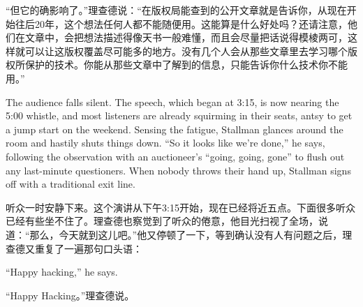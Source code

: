 \ifdefined\chs
``但它的确影响了。''理查德说：``在版权局能查到的公开文章就是告诉你，从现在开始往后20年，这个想法任何人都不能随便用。这能算是什么好处吗？还请注意，他们在文章中，会把想法描述得像天书一般难懂，而且会尽量把话说得模棱两可，这样就可以让这版权覆盖尽可能多的地方。没有几个人会从那些文章里去学习哪个版权所保护的技术。你能从那些文章中了解到的信息，只能告诉你什么技术你不能用。''
\fi

\ifdefined\eng
The audience falls silent. The speech, which began at 3:15, is now nearing the 5:00 whistle, and most listeners are already squirming in their seats, antsy to get a jump start on the weekend. Sensing the fatigue, Stallman glances around the room and hastily shuts things down. ``So it looks like we're done,'' he says, following the observation with an auctioneer's ``going, going, gone'' to flush out any last-minute questioners. When nobody throws their hand up, Stallman signs off with a traditional exit line.
\fi

\ifdefined\chs
听众一时安静下来。这个演讲从下午3:15开始，现在已经将近五点。下面很多听众已经有些坐不住了。理查德也察觉到了听众的倦意，他目光扫视了全场，说道：``那么，今天就到这儿吧。''他又停顿了一下，等到确认没有人有问题之后，理查德又重复了一遍那句口头语：
\fi

\ifdefined\eng
``Happy hacking,'' he says.
\fi

\ifdefined\chs
``Happy Hacking。''理查德说。
\fi

\theendnotes
\setcounter{endnote}{0}
